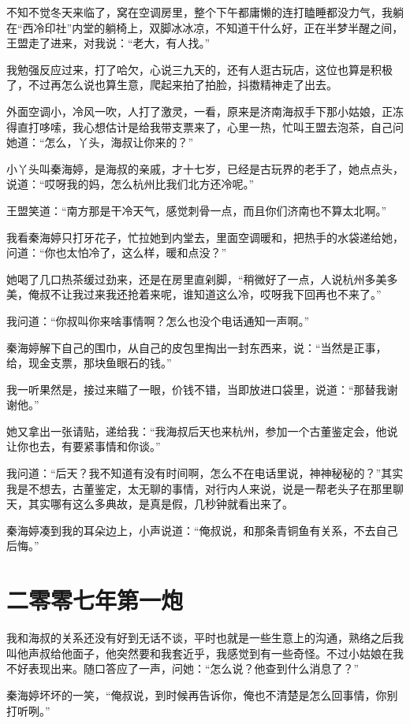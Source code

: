 不知不觉冬天来临了，窝在空调房里，整个下午都庸懒的连打瞌睡都没力气，我躺在“西冷印社”内堂的躺椅上，双脚冰冰凉，不知道干什么好，正在半梦半醒之间，王盟走了进来，对我说：“老大，有人找。”

我勉强反应过来，打了哈欠，心说三九天的，还有人逛古玩店，这位也算是积极了，不过再怎么说也算生意，爬起来拍了拍脸，抖擞精神走了出去。

外面空调小，冷风一吹，人打了激灵，一看，原来是济南海叔手下那小姑娘，正冻得直打哆嗦，我心想估计是给我带支票来了，心里一热，忙叫王盟去泡茶，自己问她道：“怎么，丫头，海叔让你来的？”

小丫头叫秦海婷，是海叔的亲戚，才十七岁，已经是古玩界的老手了，她点点头，说道：“哎呀我的妈，怎么杭州比我们北方还冷呢。”

王盟笑道：“南方那是干冷天气，感觉刺骨一点，而且你们济南也不算太北啊。”

我看秦海婷只打牙花子，忙拉她到内堂去，里面空调暖和，把热手的水袋递给她，问道：“你也太怕冷了，这么样，暖和点没？”

她喝了几口热茶缓过劲来，还是在房里直剁脚，“稍微好了一点，人说杭州多美多美，俺叔不让我过来我还抢着来呢，谁知道这么冷，哎呀我下回再也不来了。”

我问道：“你叔叫你来啥事情啊？怎么也没个电话通知一声啊。”

秦海婷解下自己的围巾，从自己的皮包里掏出一封东西来，说：“当然是正事，给，现金支票，那块鱼眼石的钱。”

我一听果然是，接过来瞄了一眼，价钱不错，当即放进口袋里，说道：“那替我谢谢他。”

她又拿出一张请贴，递给我：“我海叔后天也来杭州，参加一个古董鉴定会，他说让你也去，有要紧事情和你谈。”

我问道：“后天？我不知道有没有时间啊，怎么不在电话里说，神神秘秘的？”其实我是不想去，古董鉴定，太无聊的事情，对行内人来说，说是一帮老头子在那里聊天，其实哪有这么多典故，是真是假，几秒钟就看出来了。

秦海婷凑到我的耳朵边上，小声说道：“俺叔说，和那条青铜鱼有关系，不去自己后悔。”

\chapter{二零零七年第一炮}

我和海叔的关系还没有好到无话不谈，平时也就是一些生意上的沟通，熟络之后我叫他声叔给他面子，他突然要和我套近乎，我感觉到有一些奇怪。不过小姑娘在我不好表现出来。随口答应了一声，问她：“怎么说？他查到什么消息了？”

秦海婷坏坏的一笑，“俺叔说，到时候再告诉你，俺也不清楚是怎么回事情，你别打听咧。”

